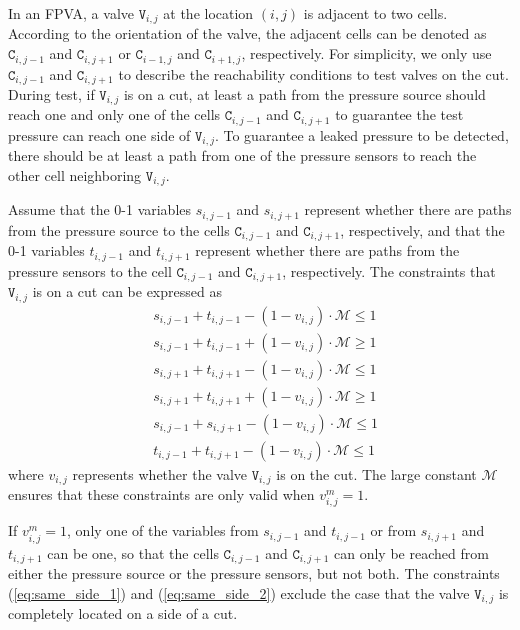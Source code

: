 \documentclass[journal,twoside]{IEEEtran}
\begin{document}
In an FPVA, a valve $\mathtt{V}_{i,j}$ at the location $(i,j)$ is adjacent to two cells.
According to the orientation of the valve, the adjacent cells 
can be denoted as $\mathtt{C}_{i,j-1}$ and $\mathtt{C}_{i,j+1}$ or
$\mathtt{C}_{i-1,j}$ and $\mathtt{C}_{i+1,j}$, respectively.
For simplicity, we only use
$\mathtt{C}_{i,j-1}$ and $\mathtt{C}_{i,j+1}$ to describe the reachability
conditions to test valves on the cut.
During test, if $\mathtt{V}_{i,j}$ is on a cut, 
at least a path from the pressure source should reach one and only one of the
cells
$\mathtt{C}_{i,j-1}$ and $\mathtt{C}_{i,j+1}$ to guarantee the test pressure
can reach one side of $\mathtt{V}_{i,j}$. To guarantee a leaked pressure to be
detected, there should be at least a path from one of the pressure sensors to reach
the other cell neighboring $\mathtt{V}_{i,j}$.


Assume that the 0-1 variables 
$s_{i,j-1}$ and $s_{i,j+1}$ represent whether there are
paths from the pressure source to the cells $\mathtt{C}_{i,j-1}$ and
$\mathtt{C}_{i,j+1}$, respectively, and 
that the 0-1 variables 
$t_{i,j-1}$ and $t_{i,j+1}$ represent whether there are
paths from the pressure sensors to the cell $\mathtt{C}_{i,j-1}$ and
$\mathtt{C}_{i,j+1}$, respectively. The constraints that $\mathtt{V}_{i,j}$
is on a cut can be expressed as
\begin{align}
\label{eq:valve_on_cut_set}
&s_{i,j-1} + t_{i,j-1} -(1-v_{i,j})\cdot\mathcal{M} \le 1\\
&s_{i,j-1} + t_{i,j-1} +(1-v_{i,j})\cdot\mathcal{M}\ge 1\\
\label{eq:valve_on_cut_set_2}
&s_{i,j+1} + t_{i,j+1}-(1-v_{i,j})\cdot\mathcal{M} \le 1\\
&s_{i,j+1} + t_{i,j+1}+(1-v_{i,j})\cdot\mathcal{M} \ge 1\\
&s_{i,j-1} + s_{i,j+1}-(1-v_{i,j})\cdot\mathcal{M} \le 1 \label{eq:same_side_1}\\
&t_{i,j-1} + t_{i,j+1}-(1-v_{i,j})\cdot\mathcal{M} \le 1\label{eq:same_side_2}
\end{align}
where $v_{i,j}$ represents whether the valve $\mathtt{V}_{i,j}$ is on the cut. 
The large constant $\mathcal{M}$ ensures that these constraints are only
valid when $v_{i,j}^m=1$. 

If $v_{i,j}^m=1$, only one of the variables from 
$s_{i,j-1}$ and $t_{i,j-1}$ or from $s_{i,j+1}$ and $t_{i,j+1}$ can be one, so
that the cells $\mathtt{C}_{i,j-1}$ and $\mathtt{C}_{i,j+1}$ can only be
reached from either the pressure source or the pressure sensors, but not both.
The constraints (\ref{eq:same_side_1}) and (\ref{eq:same_side_2})
exclude the case that the valve $\mathtt{V}_{i,j}$ is completely located on a side of a cut. 
\end{document}
